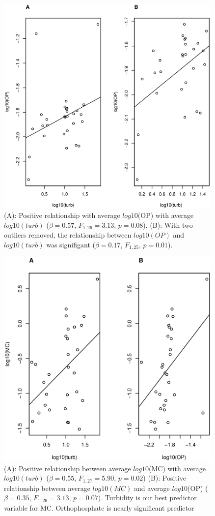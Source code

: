 \begin{figure} 
	\includegraphics[width=\textwidth, height=11cm]{figures/plot1}
	\caption{
(A): Positive relationship with average $log10$(OP) with average $log10(turb)$ ($\beta=0.57$, $F_{{1,26}}=3.13$, $p=0.08$).
(B): With two outliers removed, the relationship between $log10(OP)$ and $log10(turb)$ was signifigant  ($\beta=0.17$, $F_{{1,25}}$, $p=0.01$).
}
	\label{fig:plot1}
\end{figure}

\begin{figure}
\includegraphics[width=\textwidth, height=11cm]{figures/plot2}
\caption{
(A): Positive relationship between average $log10$(MC) with average $log10(turb)$ ($\beta=0.55$, $F_{{1,27}}=5.90$, $p=0.02$)
(B): Positive relationship between average $log10(MC)$ and average  $log10$(OP) ($\beta=0.35$, $F_{{1,26}}=3.13$, $p=0.07$). 
Turbidity is our best predictor variable for MC. Orthophosphate is nearly significant predictor}
\label{fig:plot2}
\end{figure}

